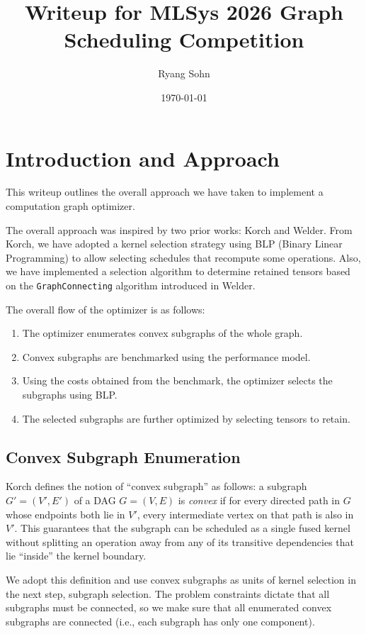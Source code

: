 \documentclass[10pt,letterpaper]{article}
\title{Writeup for MLSys 2026 Graph Scheduling Competition}
\author{Ryang Sohn}
\date{\today}
\begin{document}
\maketitle

\section{Introduction and Approach}

This writeup outlines the overall approach we have taken to implement a
computation graph optimizer.

The overall approach was inspired by two prior works: Korch\cite{korch2024}
and Welder\cite{welder2023}. From Korch, we have adopted a kernel selection
strategy using BLP (Binary Linear Programming) to allow selecting schedules
that recompute some operations. Also, we have implemented a selection
algorithm to determine retained tensors based on the \texttt{GraphConnecting}
algorithm introduced in Welder.

The overall flow of the optimizer is as follows:
\begin{enumerate}
  \item The optimizer enumerates convex subgraphs of the whole graph.
  \item Convex subgraphs are benchmarked using the performance model.
  \item Using the costs obtained from the benchmark, the optimizer selects the subgraphs using BLP.
  \item The selected subgraphs are further optimized by selecting tensors to retain.
\end{enumerate}

\subsection{Convex Subgraph Enumeration}

Korch defines the notion of ``convex subgraph'' as follows: a subgraph $G' = (V', E')$ of a DAG $G = (V, E)$ is \emph{convex} if for every directed path in $G$ whose endpoints both lie in $V'$, every intermediate vertex on that path is also in $V'$. This guarantees that the subgraph can be scheduled as a single fused kernel without splitting an operation away from any of its transitive dependencies that lie ``inside'' the kernel boundary.

We adopt this definition and use convex subgraphs as units of kernel selection in the next step, subgraph selection. The problem constraints dictate that all subgraphs must be connected, so we make sure that all enumerated convex subgraphs are connected (i.e., each subgraph has only one component).
\end{document}
